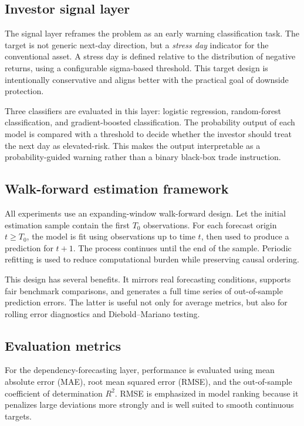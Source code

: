 \subsection{Investor signal layer}

The signal layer reframes the problem as an early warning classification task. The target is not generic next-day direction, but a \emph{stress day} indicator for the conventional asset. A stress day is defined relative to the distribution of negative returns, using a configurable sigma-based threshold. This target design is intentionally conservative and aligns better with the practical goal of downside protection.

Three classifiers are evaluated in this layer: logistic regression, random-forest classification, and gradient-boosted classification. The probability output of each model is compared with a threshold to decide whether the investor should treat the next day as elevated-risk. This makes the output interpretable as a probability-guided warning rather than a binary black-box trade instruction.

\subsection{Walk-forward estimation framework}

All experiments use an expanding-window walk-forward design. Let the initial estimation sample contain the first $T_0$ observations. For each forecast origin $t \geq T_0$, the model is fit using observations up to time $t$, then used to produce a prediction for $t+1$. The process continues until the end of the sample. Periodic refitting is used to reduce computational burden while preserving causal ordering.

This design has several benefits. It mirrors real forecasting conditions, supports fair benchmark comparisons, and generates a full time series of out-of-sample prediction errors. The latter is useful not only for average metrics, but also for rolling error diagnostics and Diebold--Mariano testing.

\subsection{Evaluation metrics}

For the dependency-forecasting layer, performance is evaluated using mean absolute error (MAE), root mean squared error (RMSE), and the out-of-sample coefficient of determination $R^2$. RMSE is emphasized in model ranking because it penalizes large deviations more strongly and is well suited to smooth continuous targets.

